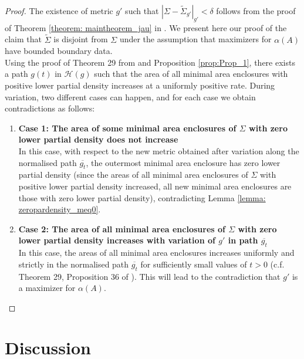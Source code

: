 \documentclass{amsart}
\newcommand{\ts}{\tilde{\Sigma}}
\newcommand{\s}{\Sigma}
\theoremstyle{named}
\begin{document}
\begin{proof} 

    The existence of metric $g'$ such that $|\s - \ts_{g'}|_{g'} < \delta$ follows from the proof of Theorem \ref{theorem: maintheorem_jau} in \cite{jeff}. We present here our proof of the claim that $\ts$ is disjoint from $\s$ under the assumption that maximizers for $\alpha(A)$ have bounded boundary data.\\
    
    Using the proof of Theorem 29 from \cite{jeff} and Proposition \ref{prop:Prop_1}, there exists a path $g(t)$ in $\mathcal{H}(g)$ such that the area of all minimal area enclosures with positive lower partial density increases at a uniformly positive rate. During variation, two different cases can happen, and for each case we obtain contradictions as follows:

    \begin{enumerate}
    
        \item \textbf{Case 1: The area of some minimal area enclosures of $\Sigma$ with zero lower partial density does not increase} \\ 
        
        In this case, with respect to the new metric obtained after variation along the normalised path $\overline{g_t}$, the outermost minimal area enclosure has zero lower partial density (since the areas of all minimal area enclosures of $\s$ with positive lower partial density increased, all new minimal area enclosures are those with zero lower partial density), contradicting Lemma \ref{lemma: zeropardensity_meq0}.
        
        \item \textbf{Case 2: The area of all minimal area enclosures of $\Sigma$ with zero lower partial density increases with variation of $g'$ in path $\overline{g_t}$ } \\ 
        
        In this case, the areas of all minimal area enclosures increases uniformly and strictly in the normalised path $\overline{g_t}$ for sufficiently small values of $t>0$ (c.f. Theorem 29, Proposition 36 of \cite{jeff}). This will lead to the contradiction that $g'$ is a maximizer for $\alpha(A)$.
        
    \end{enumerate}
\end{proof}

\section{Discussion} \label{section: discussion}
\end{document}
